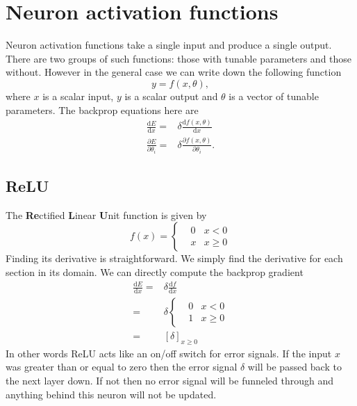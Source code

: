 \documentclass[a4paper]{article}
\begin{document}
\newpage
\section{Neuron activation functions}
Neuron activation functions take a single input and produce a single output. There are two groups of such functions: those with tunable parameters and those without. However in the general case we can write down the following function
\begin{equation}
y = f(x,\theta),
\end{equation}
where $x$ is a scalar input, $y$ is a scalar output and $\theta$ is a vector of tunable parameters. The backprop equations here are 
\begin{align} \label{eq:elementwise}
\frac{\mathrm{d} E }{\mathrm{d} x} = & \delta \frac{\mathrm{d} f(x,\theta)}{\mathrm{d} x}\\
\frac{\partial E }{\partial \theta_i} = & \delta \frac{\partial f(x,\theta)}{\partial \theta_i}.
\end{align}

\subsection{ReLU}
The {\bf Re}ctified {\bf L}inear {\bf U}nit function is given by
\begin{equation}
f(x)=\left\{\begin{matrix}
 & 0 & x< 0\\ 
 & x & x \geq 0
\end{matrix}\right.
\end{equation}
Finding its derivative is straightforward. We simply find the derivative for each section in its domain. We can directly compute the backprop gradient
\begin{align}
\frac{\mathrm{d} E }{\mathrm{d} x}= &\delta \frac{\mathrm{d} f }{\mathrm{d} x} \\
= & \delta \left\{\begin{matrix}
 & 0 & x< 0\\ 
 & 1 & x \geq 0
\end{matrix}\right. \\
= & \left [ \delta \right ]_{x \geq 0}
\end{align}
In other words ReLU acts like an on/off switch for error signals. If the input $x$ was greater than or equal to zero then the error signal $\delta$ will be passed back to the next layer down. If not then no error signal will be funneled through and anything behind this neuron will not be updated. 
\end{document}
